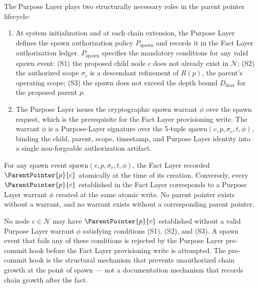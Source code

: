 The Purpose Layer plays two structurally necessary roles in the parent pointer lifecycle:

\begin{enumerate}
    \item[(A1) \textbf{Policy origination.}] At system initialization and at each chain extension, the Purpose Layer defines the spawn authorization policy $P_{\mathrm{spawn}}$ and records it in the Fact Layer authorization ledger. $P_{\mathrm{spawn}}$ specifies the mandatory conditions for any valid spawn event: (S1) the proposed child node $c$ does not already exist in $\mathcal{N}$; (S2) the authorized scope $\sigma_c$ is a descendant refinement of $R(p)$, the parent's operating scope; (S3) the spawn does not exceed the depth bound $D_{\max}$ for the proposed parent $p$.

    \item[(A2) \textbf{Warrant issuance.}] The Purpose Layer issues the cryptographic spawn warrant $\phi$ over the spawn request, which is the prerequisite for the Fact Layer provisioning write. The warrant $\phi$ is a Purpose-Layer signature over the 5-tuple $\mathrm{spawn}(c, p, \sigma_c, t, \phi)$, binding the child, parent, scope, timestamp, and Purpose Layer identity into a single non-forgeable authorization artifact.
\end{enumerate}

\begin{prop}
\label{prop:warrant-pointer}
For any spawn event $\mathrm{spawn}(c, p, \sigma_c, t, \phi)$, the Fact Layer recorded $\ParentPointer{p}{c}$ atomically at the time of its creation. Conversely, every $\ParentPointer{p}{c}$ established in the Fact Layer corresponds to a Purpose Layer warrant $\phi$ created at the same atomic write. No parent pointer exists without a warrant, and no warrant exists without a corresponding parent pointer.
\end{prop}

\begin{prop}
\label{prop:auth-necessity}
No node $c \in \mathcal{N}$ may have $\ParentPointer{p}{c}$ established without a valid Purpose Layer warrant $\phi$ satisfying conditions (S1), (S2), and (S3). A spawn event that fails any of these conditions is rejected by the Purpose Layer pre-commit hook before the Fact Layer provisioning write is attempted. The pre-commit hook is the structural mechanism that prevents unauthorized chain growth at the point of spawn --- not a documentation mechanism that records chain growth after the fact.
\end{prop}

